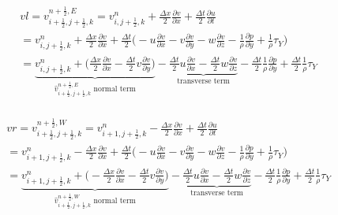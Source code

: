 \documentclass{article}
\numberwithin{equation}{subsection}
\begin{document}
\begin{align}
\begin{split}
& vl = v_{i+\frac{1}{2},j+\frac{1}{2},k}^{n+\frac{1}{2},E} = v_{i,j+\frac{1}{2},k}^n + \frac{\Delta x}{2}\frac{\partial v}{\partial x} + \frac{\Delta t}{2}\frac{\partial u}{\partial t} \\
&= v_{i,j+\frac{1}{2},k}^n + \frac{\Delta x}{2} \frac{\partial v}{\partial x} + \frac{\Delta t}{2} \Big( -u\frac{\partial v}{\partial x} -v\frac{\partial v}{\partial y} -w\frac{\partial v}{\partial z} - \frac{1}{\rho}\frac{\partial p}{\partial y} +\frac{1}{\rho}\tau_Y\Big) \\
&= \underbrace{v_{i,j+\frac{1}{2},k}^n + \Big(\frac{\Delta x}{2}\frac{\partial v}{\partial x} - \frac{\Delta t}{2} v\frac{\partial v}{\partial y}\Big)}_\text{$\widehat{v}_{i+\frac{1}{2},j+\frac{1}{2},k}^{n+\frac{1}{2},E}$ normal term} -\underbrace{\frac{\Delta t}{2}u\frac{\partial v}{\partial x} - \frac{\Delta t}{2}w\frac{\partial v}{\partial z}}_\text{transverse term} - \frac{\Delta t}{2}\frac{1}{\rho}\frac{\partial p}{\partial y} + \frac{\Delta t}{2}\frac{1}{\rho}\tau_Y
\end{split}
\end{align}

\begin{align}
\begin{split}
& vr = v_{i+\frac{1}{2},j+\frac{1}{2},k}^{n+\frac{1}{2},W} = v_{i+1,j+\frac{1}{2},k}^n - \frac{\Delta x}{2}\frac{\partial v}{\partial x} + \frac{\Delta t}{2}\frac{\partial u}{\partial t} \\
&= v_{i+1,j+\frac{1}{2},k}^n - \frac{\Delta x}{2} \frac{\partial v}{\partial x} + \frac{\Delta t}{2} \Big( -u\frac{\partial v}{\partial x} -v\frac{\partial v}{\partial y} -w\frac{\partial v}{\partial z} - \frac{1}{\rho}\frac{\partial p}{\partial y} +\frac{1}{\rho}\tau_Y\Big) \\
&= \underbrace{v_{i+1,j+\frac{1}{2},k}^n + \Big(-\frac{\Delta x}{2}\frac{\partial v}{\partial x} - \frac{\Delta t}{2} v\frac{\partial v}{\partial y}\Big)}_\text{$\widehat{v}_{i+\frac{1}{2},j+\frac{1}{2},k}^{n+\frac{1}{2},W}$ normal term} -\underbrace{\frac{\Delta t}{2}u\frac{\partial v}{\partial x} - \frac{\Delta t}{2}w\frac{\partial v}{\partial z}}_\text{transverse term} - \frac{\Delta t}{2}\frac{1}{\rho}\frac{\partial p}{\partial y} + \frac{\Delta t}{2}\frac{1}{\rho}\tau_Y
\end{split}
\end{align}
\end{document}
